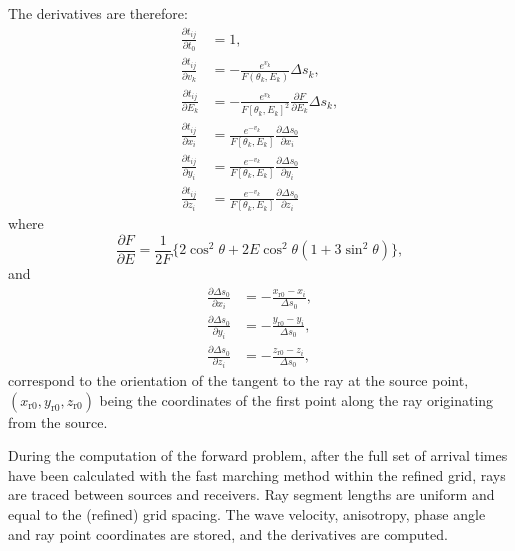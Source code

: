\documentclass{article}
\begin{document}
The derivatives are therefore:
\begin{align}
  \frac{\partial t_{ij}}{\partial t_0} &= 1, \\
  \frac{\partial t_{ij}}{\partial v_k} &= -\frac{e^{v_k}}{F(\theta_k,E_k)}\Delta s_k, \\
  \frac{\partial t_{ij}}{\partial E_k} &= -\frac{e^{v_k}}{F[\theta_k,E_k]^2}\frac{\partial F}{\partial E_k}\Delta s_k,\\
  \frac{\partial t_{ij}}{\partial x_i} &= \frac{e^{-v_k}}{F[\theta_k,E_k]}\frac{\partial \Delta s_0}{\partial x_i}\\
  \frac{\partial t_{ij}}{\partial y_i} &= \frac{e^{-v_k}}{F[\theta_k,E_k]}\frac{\partial \Delta s_0}{\partial y_i}\\
  \frac{\partial t_{ij}}{\partial z_i} &= \frac{e^{-v_k}}{F[\theta_k,E_k]}\frac{\partial \Delta s_0}{\partial z_i}
\end{align}
where
\begin{equation}
  \frac{\partial F}{\partial E} = \frac{1}{2 F}\{2\cos^2\theta + 2E\cos^2\theta (1+3\sin^2\theta) \},
\end{equation}
and
\begin{align}
  \frac{\partial \Delta s_0}{\partial x_i} &= -\frac{x_{\mathrm{r}0}-x_i}{\Delta s_0}, \\
  \frac{\partial \Delta s_0}{\partial y_i} &= -\frac{y_{\mathrm{r}0}-y_i}{\Delta s_0}, \\
  \frac{\partial \Delta s_0}{\partial z_i} &= -\frac{z_{\mathrm{r}0}-z_i}{\Delta s_0},
\end{align}
correspond to the orientation of the tangent to the ray at the source point, $(x_{\mathrm{r}0},y_{\mathrm{r}0},z_{\mathrm{r}0})$ being the coordinates  of the first point along the ray originating from the source.

During the computation of the forward problem, after the full set of arrival times have been calculated with the fast marching method within the refined grid, rays are traced between sources and receivers. Ray segment lengths are uniform and equal to the (refined) grid spacing. The wave velocity, anisotropy, phase angle and ray point coordinates are stored, and the derivatives are computed.
\end{document}
